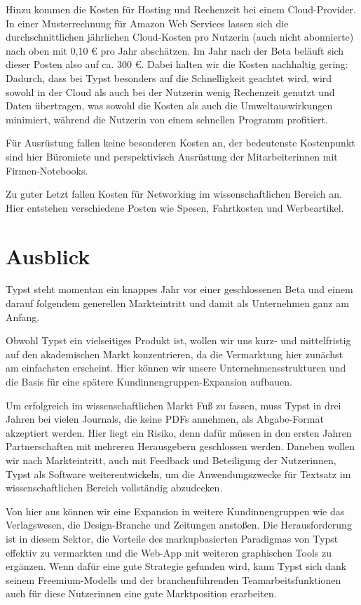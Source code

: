 \documentclass[11pt, a4paper]{article}
\newcommand{\gender}{\raisebox{-.25em}{*}}
\let\oldsection\section
\renewcommand\section{\clearpage\oldsection}
\begin{document}
Hinzu kommen die Kosten für Hosting und Rechenzeit bei einem Cloud-Provider. In einer Musterrechnung für Amazon Web Services lassen sich die durchschnittlichen jährlichen Cloud-Kosten pro Nutzer\gender{}in (auch nicht abonnierte) nach oben mit 0,10 € pro Jahr abschätzen. Im Jahr nach der Beta beläuft sich dieser Posten also auf ca. 300 €. Dabei halten wir die Kosten nachhaltig gering: Dadurch, dass bei Typst besonders auf die Schnelligkeit geachtet wird, wird sowohl in der Cloud als auch bei der\gender{} Nutzer\gender{}in wenig Rechenzeit genutzt und Daten übertragen, was sowohl die Kosten als auch die Umweltauswirkungen minimiert, während die\gender{} Nutzer\gender{}in von einem schnellen Programm profitiert.

Für Ausrüstung fallen keine besonderen Kosten an, der bedeutenste Kostenpunkt sind hier Büromiete und perspektivisch Ausrüstung der Mitarbeiter\gender{}innen mit Firmen-Notebooks.

Zu guter Letzt fallen Kosten für Networking im wissenschaftlichen Bereich an. Hier entstehen verschiedene Posten wie Spesen, Fahrtkosten und Werbeartikel.

\section*{Ausblick}
\vspace{2mm}

Typst steht momentan ein knappes Jahr vor einer geschlossenen Beta und einem darauf folgendem generellen Markteintritt und damit als Unternehmen ganz am Anfang.

Obwohl Typst ein vielseitiges Produkt ist, wollen wir uns kurz- und mittelfristig auf den akademischen Markt konzentrieren, da die Vermarktung hier zunächst am einfachsten erscheint. Hier können wir unsere Unternehmensstrukturen und die Basis für eine spätere Kund\gender{}innengruppen-Expansion aufbauen.

Um erfolgreich im wissenschaftlichen Markt Fuß zu fassen, muss Typst in drei Jahren bei vielen Journals, die keine PDFs annehmen, als Abgabe-Format akzeptiert werden. Hier liegt ein Risiko, denn dafür müssen in den ersten Jahren Partnerschaften mit mehreren Herausgebern geschlossen werden. Daneben wollen wir nach Markteintritt, auch mit Feedback und Beteiligung der Nutzer\gender{}innen, Typst als Software weiterentwickeln, um die Anwendungszwecke für Textsatz im wissenschaftlichen Bereich vollständig abzudecken.

Von hier aus können wir eine Expansion in weitere Kund\gender{}innengruppen wie das Verlagswesen, die Design-Branche und Zeitungen anstoßen. Die Herausforderung ist in diesem Sektor, die Vorteile des markupbasierten Paradigmas von Typst effektiv zu vermarkten und die Web-App mit weiteren graphischen Tools zu ergänzen. Wenn dafür eine gute Strategie gefunden wird, kann Typst sich dank seinem Freemium-Modells und der branchenführenden Teamarbeitsfunktionen auch für diese Nutzer\gender{}innen eine gute Marktposition erarbeiten.
\end{document}
